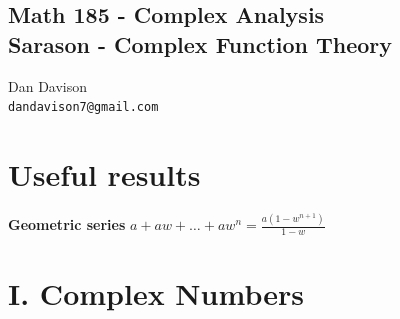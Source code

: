 \documentclass[12pt]{article}
\begin{document}
\begin{center}
  \section*{
    Math 185 - Complex Analysis\\
    Sarason - Complex Function Theory\\
  }
\end{center}
\begin{center}
  \small{
    Dan Davison\\
    \texttt{dandavison7@gmail.com}
  }
\end{center}

\section*{Useful results}
\textbf{Geometric series} $a + aw + \ldots + aw^n = \frac{a(1 - w^{n+1})}{1-w}$

\section*{I. Complex Numbers}
\end{document}
